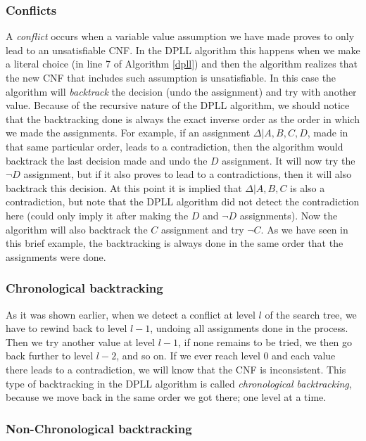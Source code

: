 \documentclass[12pt]{diicc}
\begin{document}
\subsubsection{Conflicts}

A \textit{conflict} occurs when a variable value assumption we have made proves to only lead to an unsatisfiable CNF. In the DPLL algorithm this happens when we make a literal choice (in line 7 of Algorithm \ref{dpll}) and then the algorithm realizes that the new CNF that includes such assumption is unsatisfiable. In this case the algorithm will \textit{backtrack} the decision (undo the assignment) and try with another value. Because of the recursive nature of the DPLL algorithm, we should notice that the backtracking done is always the exact inverse order as the order in which we made the assignments. For example, if an assignment $\Delta | A,B,C,D$, made in that same particular order, leads to a contradiction, then the algorithm would backtrack the last decision made and undo the $D$ assignment. It will now try the $\neg D$ assignment, but if it also proves to lead to a contradictions, then it will also backtrack this decision. At this point it is implied that $\Delta | A,B,C$ is also a contradiction, but note that the DPLL algorithm did not detect the contradiction here (could only imply it after making the $D$ and $\neg D$ assignments). Now the algorithm will also backtrack the $C$ assignment and try $\neg C$. As we have seen in this brief example, the backtracking is always done in the same order that the assignments were done.

\subsubsection{Chronological backtracking}

As it was shown earlier, when we detect a conflict at level $l$ of the search tree, we have to rewind back to level $l-1$, undoing all assignments done in the process. Then we try another value at level $l-1$, if none remains  to be tried, we then go back further to level $l-2$, and so on. If we ever reach level $0$ and each value there leads to a contradiction, we will know that the CNF is inconsistent. This type of backtracking in the DPLL algorithm is called \textit{chronological backtracking}, because we move back in the same order we got there; one level at a time. 

\subsubsection{Non-Chronological backtracking}
\end{document}
